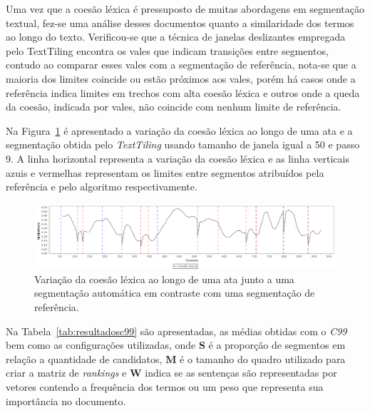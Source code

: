 

Uma vez que a coesão léxica é pressuposto de muitas abordagens em segmentação textual, fez-se uma análise desses documentos quanto a similaridade dos termos ao longo do texto. Verificou-se que a técnica de janelas deslizantes empregada pelo TextTiling encontra os vales que indicam transições entre segmentos, contudo ao comparar esses vales com a segmentação de referência, nota-se que a maioria dos limites coincide ou estão próximos aos vales, porém há casos onde a referência indica limites em trechos com alta coesão léxica e outros onde a queda da coesão, indicada por vales, não coincide com nenhum limite de referência.  

Na Figura~\ref{fig:coesaolexicaTT} é apresentado a variação da coesão léxica ao longo de uma ata e a segmentação obtida pelo \textit{TextTiling} usando tamanho de janela igual a 50 e passo 9. A linha horizontal representa a variação da coesão léxica e as linha verticais azuis e vermelhas representam os limites entre segmentos atribuídos pela referência e pelo algoritmo respectivamente. 


  \begin{figure}[!h]
	  \centering
	  \includegraphics[width=\textwidth]{conteudo/capitulos/figs/coesaolexicaTT-50-9.png}
	  \caption{Variação da coesão léxica ao longo de uma ata junto a uma segmentação automática em contraste com uma segmentação de referência.}
	  \label{fig:coesaolexicaTT}
  \end{figure}




Na Tabela~\ref{tab:resultadosc99} são apresentadas, as médias obtidas com o \textit{C99} bem como as configurações utilizadas, onde \textbf{S} é a proporção de segmentos em relação a quantidade de candidatos, \textbf{M} é o tamanho do quadro utilizado para criar a matriz de \textit{rankings} e \textbf{W} indica se as sentenças são representadas por vetores contendo a frequência dos termos ou um peso que representa sua importância no documento. %

